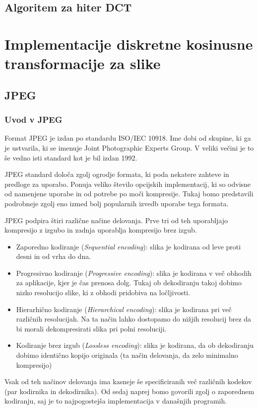 \documentclass[a4paper,12pt,openright]{book}
\begin{document}
\section{Algoritem za hiter DCT}\label{Algoritem za hiter DCT}



\chapter{Implementacije diskretne kosinusne transformacije za slike}
\label{ch2}

\section{JPEG}
\subsection{Uvod v JPEG}
Format JPEG je izdan po standardu ISO/IEC 10918. Ime dobi od skupine, ki ga je ustvarila, ki se imenuje Joint Photographic Experts Group. V veliki večini je to še vedno isti standard kot je bil izdan 1992.\par
JPEG standard določa zgolj ogrodje formata, ki poda nekatere zahteve in predloge za uporabo. Ponuja veliko število opcijskih implementacij, ki so odvisne od namenjene uporabe in od potrebe po moči kompresije. Tukaj bomo predstavili podrobneje zgolj eno izmed bolj popularnih izvedb uporabe tega formata.\par 

JPEG podpira štiri različne načine delovanja. Prve tri od teh uporabljajo kompresijo z izgubo in zadnja uporablja kompresijo brez izgub.
\begin{itemize}
   \item Zaporedno kodiranje (\textit{Sequential encoding}): slika je kodirana od leve proti desni in od vrha do dna.
   \item Progresivno kodiranje (\textit{Progressive encoding}): slika je kodirana v več obhodih za aplikacije, kjer je čas prenosa dolg. Tukaj ob dekodiranju takoj dobimo nizko resolucijo slike, ki z obhodi pridobiva na ločljivosti.
   \item Hierarhično kodiranje (\textit{Hierarchical encoding}): slika je kodirana pri več različnih resolucijah. Na ta način lahko dostopamo do nižjih resolucij brez da bi morali dekompresirati slika pri polni resoluciji.
   \item Kodiranje brez izgub (\textit{Lossless encoding}): slika je kodirana, da ob dekodiranju dobimo identično kopijo originala (ta način delovanja, da zelo minimalno kompresijo)
\end{itemize}
Vsak od teh načinov delovanja ima kasneje še specificiranih več različnih kodekov (par kodirnika in dekodirnika).
Od sedaj naprej bomo govorili zgolj o zaporednem kodiranju, saj je to najpogostejša implementacija v današnjih programih.\par
\end{document}
